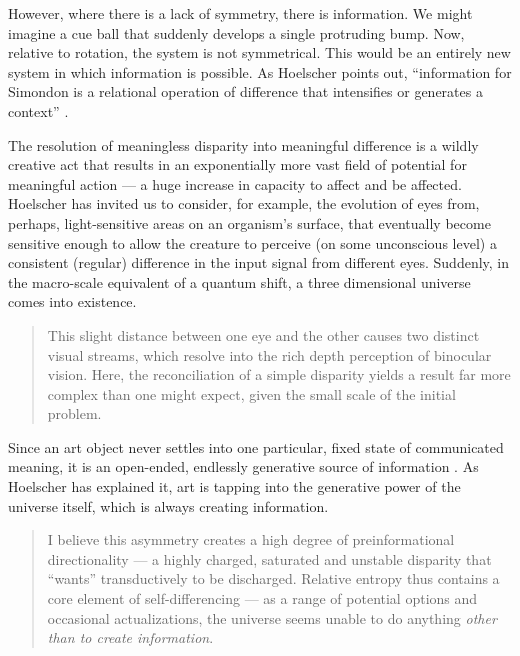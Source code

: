 \documentclass[letterpaper]{article}
\begin{document}
    However, where there is a lack of symmetry, there is information. We might imagine a cue ball that suddenly develops a single protruding bump. Now, relative to rotation, the system is not symmetrical. This would be an entirely new system in which information is possible. As Hoelscher points out, “information for Simondon is a relational operation of difference that intensifies or generates a context” \citep[p.6]{HoelscherArtAsInfrmtn2021}. 

    The resolution of meaningless disparity into meaningful difference is a wildly creative act that results in an exponentially more vast field of potential for meaningful action — a huge increase in capacity to affect and be affected. Hoelscher has invited us to consider, for example, the evolution of eyes from, perhaps, light-sensitive areas on an organism's surface, that eventually become sensitive enough to allow the creature to perceive (on some unconscious level) a consistent (regular) difference in the input signal from different eyes. Suddenly, in the macro-scale equivalent of a quantum shift, a three dimensional universe comes into existence.

    \begin{quote}
        This slight distance between one eye and the other causes two distinct visual streams, which resolve into the rich depth perception of binocular vision. Here, the reconciliation of a simple disparity yields a result far more complex than one might expect, given the small scale of the initial problem. \citep[p.5]{HoelscherArtAsInfrmtn2021}
    \end{quote}

    Since an art object never settles into one particular, fixed state of communicated meaning, it is an open-ended, endlessly generative source of information \citep[p.7]{HoelscherThPtcsOfPhsSpc2014}. As Hoelscher has explained it, art is tapping into the generative power of the universe itself, which is always creating information.

    \begin{quote}
        I believe this asymmetry creates a high degree of preinformational directionality — a highly charged, saturated and unstable disparity that “wants” transductively to be discharged. Relative entropy thus contains a core element of self-differencing — as a range of potential options and occasional actualizations, the universe seems unable to do anything \emph{other than to create information}.
    \end{quote}
\end{document}
